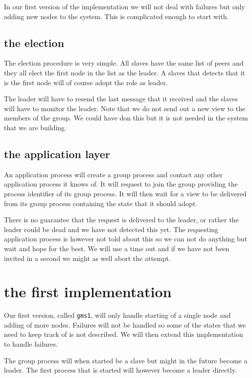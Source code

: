 \documentclass[a4paper,11pt]{article}
\begin{document}
In our first version of the implementation we will not deal with
failures but only adding new nodes to the system. This is complicated
enough to start with.

\subsection{the election}

The election procedure is very simple. All slaves have the same list
of peers and they all elect the first node in the list as the
leader. A slaves that detects that it is the first node will of course
adopt the role as leader. 

The leader will have to resend the last message that it received and
the slaves will have to monitor the leader. Note that we do not send
out a new view to the members of the group. We could have don this but
it is not needed in the system that we are building.

\subsection{the application layer}

An application process will create a group process and contact any
other application process it knows of. It will request to join the
group providing the process identifier of its group process. It will
then wait for a view to be delivered from its group process containing
the state that it should adopt.

There is no guarantee that the request is delivered to the leader, or
rather the leader could be dead and we have not detected this yet. The
requesting application process is however not told about this so we
can not do anything but wait and hope for the best. We will use a time
out and if we have not been invited in a second we might as well abort
the attempt.

\section{the first implementation}

Our first version, called {\tt gms1}, will only handle starting of a
single node and adding of more nodes. Failures will not be handled so
some of the states that we need to keep track of is not described. We
will then extend this implementation to handle failures.

The group process will when started be a slave but might in the future
become a leader. The first process that is started will however become a
leader directly.
\end{document}
